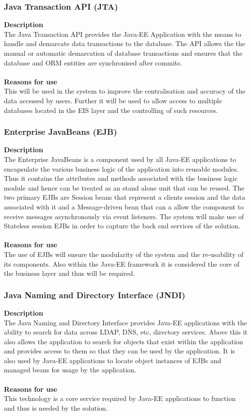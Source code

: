 \documentclass[12pt]{article}
\begin{document}
\subsubsection{Java Transaction API (JTA)}
\textbf{Description}\\
The Java Transaction API provides the Java-EE Application with the means to handle and demarcate data transactions to the database. The API allows the the manual or automatic demarcation of database transactions and ensures that the database and ORM entities are synchronised after commits.\\\\ 
\textbf{Reasons for use}\\
This will be used in the system to improve the centralisation and accuracy of the data accessed by users. Further it will be used to allow access to multiple databases located in the EIS layer and the controlling of such resources.

\subsubsection{Enterprise JavaBeans (EJB)}
\textbf{Description}\\
The Enterprise JavaBeans is a component used by all Java-EE applications to encapsulate the various business logic of the application into reusable modules. Thus it contains the attributes and methods associated with the business logic module and hence can be treated as an stand alone unit that can be reused. The two primary EJBs are Session beans that represent a clients session and the data associated with it and a Message-driven bean that can a allow the component to receive messages asynchronously via event listeners. The system will make use of Stateless session EJBs in order to capture the back end services of the solution.\\\\
\textbf{Reasons for use}\\
The use of EJBs will ensure the modularity of the system and the re-usability of its components. Also within the Java-EE framework it is considered the core of the business layer and thus will be required.
  

\subsubsection{Java Naming and Directory Interface (JNDI)}
\textbf{Description}\\
The Java Naming and Directory Interface provides Java-EE applications with the ability to search for data across LDAP, DNS, etc, directory services. Above this it also allows the application to search for objects that exist within the application and provides access to them so that they can be used by the application. It is also used by Java-EE applications to locate object instances of EJBs and managed beans for usage by the application.\\\\
\textbf{Reasons for use}\\
This technology is a core service required by Java-EE applications to function and thus is needed by the solution.
\end{document}
